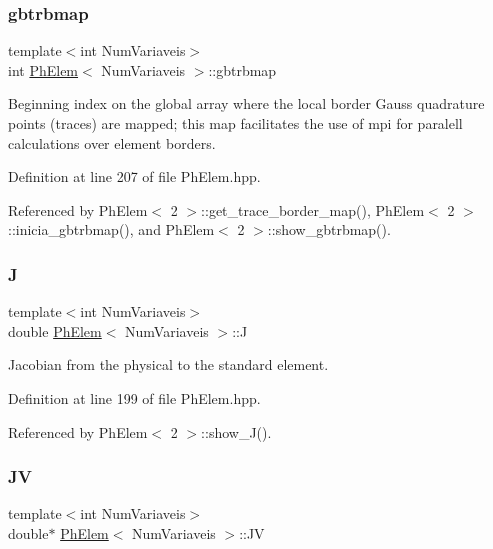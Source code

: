 \subsubsection{\texorpdfstring{gbtrbmap}{gbtrbmap}}
{\footnotesize\ttfamily template$<$int Num\+Variaveis$>$ \\
int \hyperlink{classPhElem}{Ph\+Elem}$<$ Num\+Variaveis $>$\+::gbtrbmap\hspace{0.3cm}{\ttfamily [protected]}}



Beginning index on the global array where the local border Gauss quadrature points (traces) are mapped; this map facilitates the use of mpi for paralell calculations over element borders. 



Definition at line 207 of file Ph\+Elem.\+hpp.



Referenced by Ph\+Elem$<$ 2 $>$\+::get\+\_\+trace\+\_\+border\+\_\+map(), Ph\+Elem$<$ 2 $>$\+::inicia\+\_\+gbtrbmap(), and Ph\+Elem$<$ 2 $>$\+::show\+\_\+gbtrbmap().

\mbox{\label{classPhElem_a27acf6bc6ac9eaf94a7cce52522b3b92}} 
\subsubsection{\texorpdfstring{J}{J}}
{\footnotesize\ttfamily template$<$int Num\+Variaveis$>$ \\
double \hyperlink{classPhElem}{Ph\+Elem}$<$ Num\+Variaveis $>$\+::J\hspace{0.3cm}{\ttfamily [protected]}}



Jacobian from the physical to the standard element. 



Definition at line 199 of file Ph\+Elem.\+hpp.



Referenced by Ph\+Elem$<$ 2 $>$\+::show\+\_\+\+J().

\mbox{\label{classPhElem_a569278e8b30ca90d0e6f920b5bba7dd5}} 
\subsubsection{\texorpdfstring{JV}{JV}}
{\footnotesize\ttfamily template$<$int Num\+Variaveis$>$ \\
double$\ast$ \hyperlink{classPhElem}{Ph\+Elem}$<$ Num\+Variaveis $>$\+::JV\hspace{0.3cm}{\ttfamily [protected]}}



